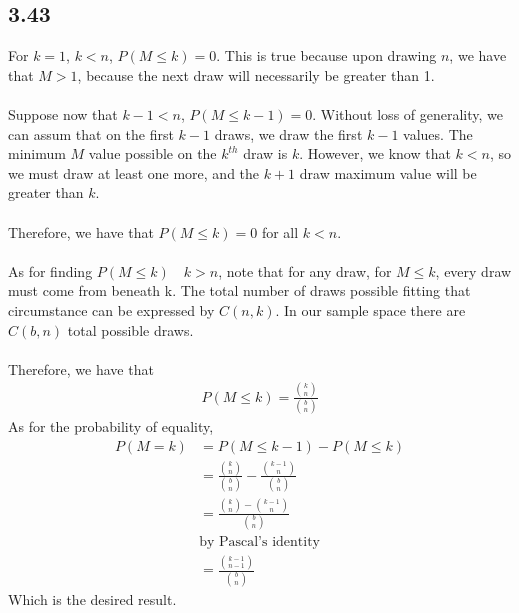 \documentclass[letterpaper,12pt]{article}
\theoremstyle{definition}
\begin{document}
\subsection*{3.43}


For $k =1$, $k<n$,
$P(M \leq k) = 0$. This is true because upon drawing $n$, we have that $M > 1$, because the next draw will necessarily be greater than 1.\\\\
Suppose now that $k-1 < n$, $P(M \leq k-1) = 0$.
Without loss of generality, we can assum that on the first $k-1$ draws, we draw the first $k-1$ values. The minimum $M$ value possible on the $k^{th}$ draw is $k$. However, we know that $k<n$, so we must draw at least one more, and the $k+1$ draw maximum value will be greater than $k$.\\\\
Therefore, we have that $P(M \leq k) = 0$ for all $k < n$.\\\\
As for finding $P(M \leq k) \quad k>n$, note that for any draw, for $M \leq k$, every draw must come from beneath k. The total number of draws possible fitting that circumstance can be expressed by $C(n,k)$. In our sample space there are $C(b,n)$ total possible draws.\\\\
Therefore, we have that
\begin{align*}
    P(M \leq k) = \frac{\binom kn}{\binom bn}
\end{align*}
As for the probability of equality,
\begin{align*}
    P(M = k) &= P(M \leq k-1) - P(M \leq k) \\
    & = \frac{\binom{k}{n}}{\binom bn} - \frac{\binom{k-1}n}{\binom bn}\\
    & = \frac{\binom{k}{n} - \binom{k-1}n}{\binom bn}\\
    &\text{by Pascal's identity}\\
    & = \frac{\binom{k-1}{n-1}}{\binom bn}
\end{align*}
Which is the desired result.
\end{document}
